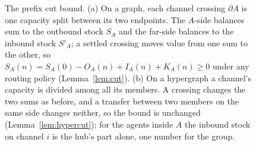 \begin{figure}[t]
\caption{The prefix cut bound. (a) On a graph, each channel crossing $\partial A$ is one capacity split between its two endpoints. The $A$-side balances sum to the outbound stock $S_A$ and the far-side balances to the inbound stock $S'_A$; a settled crossing moves value from one sum to the other, so $S_A(n)=S_A(0)-O_A(n)+I_A(n)+K_A(n)\ge 0$ under any routing policy (Lemma~\ref{lem:cut}). (b) On a hypergraph a channel's capacity is divided among all its members. A crossing changes the two sums as before, and a transfer between two members on the same side changes neither, so the bound is unchanged (Lemma~\ref{lem:hypercut}); for the agents inside $A$ the inbound stock on channel $i$ is the hub's part alone, one number for the group.}
\label{fig:cut}
\end{figure}
